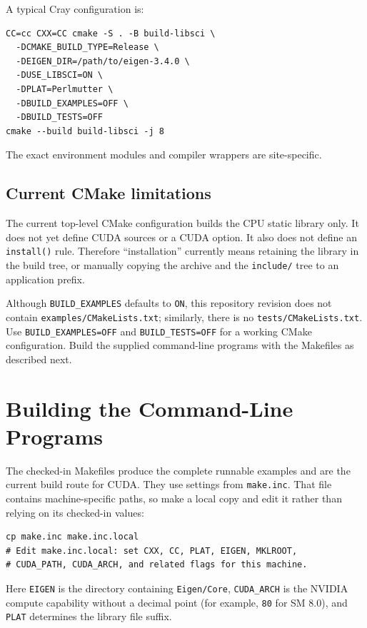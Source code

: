 \documentclass[11pt]{article}
\newcommand{\code}[1]{\texttt{#1}}
\begin{document}
A typical Cray configuration is:

\begin{lstlisting}
CC=cc CXX=CC cmake -S . -B build-libsci \
  -DCMAKE_BUILD_TYPE=Release \
  -DEIGEN_DIR=/path/to/eigen-3.4.0 \
  -DUSE_LIBSCI=ON \
  -DPLAT=Perlmutter \
  -DBUILD_EXAMPLES=OFF \
  -DBUILD_TESTS=OFF
cmake --build build-libsci -j 8
\end{lstlisting}

The exact environment modules and compiler wrappers are site-specific.

\subsection{Current CMake limitations}
\label{sec:cmake-limitations}

The current top-level CMake configuration builds the CPU static library only.
It does not yet define CUDA sources or a CUDA option.  It also does not define
an \code{install()} rule.  Therefore ``installation'' currently means retaining
the library in the build tree, or manually copying the archive and the
\code{include/} tree to an application prefix.

Although \code{BUILD\_EXAMPLES} defaults to \code{ON}, this repository revision
does not contain \code{examples/CMakeLists.txt}; similarly, there is no
\code{tests/CMakeLists.txt}.  Use \code{BUILD\_EXAMPLES=OFF} and
\code{BUILD\_TESTS=OFF} for a working CMake configuration.  Build the supplied
command-line programs with the Makefiles as described next.

\section{Building the Command-Line Programs}

The checked-in Makefiles produce the complete runnable examples and are the
current build route for CUDA.  They use settings from \code{make.inc}.  That
file contains machine-specific paths, so make a local copy and edit it rather
than relying on its checked-in values:

\begin{lstlisting}
cp make.inc make.inc.local
# Edit make.inc.local: set CXX, CC, PLAT, EIGEN, MKLROOT,
# CUDA_PATH, CUDA_ARCH, and related flags for this machine.
\end{lstlisting}

Here \code{EIGEN} is the directory containing \code{Eigen/Core},
\code{CUDA\_ARCH} is the NVIDIA compute capability without a decimal point
(for example, \code{80} for SM 8.0), and \code{PLAT} determines the library
file suffix.
\end{document}
